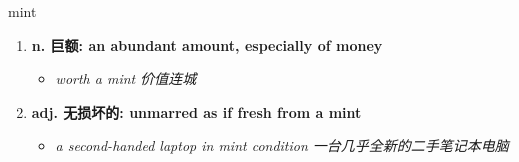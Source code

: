
\begin{frame}
{\huge mint}
\begin{center}
\begin{enumerate}\Large
  \item \textbf{n. 巨额: an abundant amount, especially of money}
  \begin{itemize}
    \item \em{\Large{worth a mint 价值连城}}
  \end{itemize}
  \item \textbf{adj. 无损坏的: unmarred as if fresh from a mint}
  \begin{itemize}
    \item \em{\Large{a second-handed laptop in mint condition 一台几乎全新的二手笔记本电脑}}
  \end{itemize}
\end{enumerate}
\end{center}
\end{frame}
